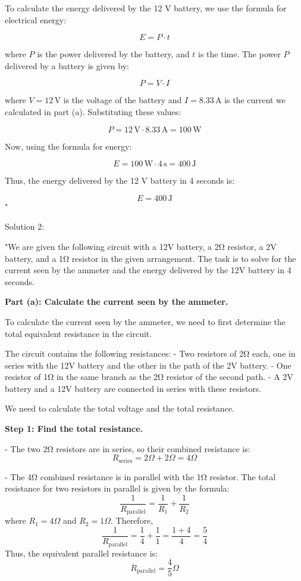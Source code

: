 To calculate the energy delivered by the 12 V battery, we use the formula for electrical energy:

\[
E = P \cdot t
\]

where \( P \) is the power delivered by the battery, and \( t \) is the time. The power \( P \) delivered by a battery is given by:

\[
P = V \cdot I
\]

where \( V = 12 \, \text{V} \) is the voltage of the battery and \( I = 8.33 \, \text{A} \) is the current we calculated in part (a). Substituting these values:

\[
P = 12 \, \text{V} \cdot 8.33 \, \text{A} = 100 \, \text{W}
\]

Now, using the formula for energy:

\[
E = 100 \, \text{W} \cdot 4 \, \text{s} = 400 \, \text{J}
\]

Thus, the energy delivered by the 12 V battery in 4 seconds is:

\[
E = 400 \, \text{J}
\]"

Solution 2:

"We are given the following circuit with a 12V battery, a 2Ω resistor, a 2V battery, and a 1Ω resistor in the given arrangement. The task is to solve for the current seen by the ammeter and the energy delivered by the 12V battery in 4 seconds.

\textbf{Part (a): Calculate the current seen by the ammeter.}

To calculate the current seen by the ammeter, we need to first determine the total equivalent resistance in the circuit.

The circuit contains the following resistances:
- Two resistors of 2Ω each, one in series with the 12V battery and the other in the path of the 2V battery.
- One resistor of 1Ω in the same branch as the 2Ω resistor of the second path.
- A 2V battery and a 12V battery are connected in series with these resistors.

We need to calculate the total voltage and the total resistance.

\textbf{Step 1: Find the total resistance.}

- The two 2Ω resistors are in series, so their combined resistance is:
  \[
  R_{\text{series}} = 2Ω + 2Ω = 4Ω
  \]

- The 4Ω combined resistance is in parallel with the 1Ω resistor. The total resistance for two resistors in parallel is given by the formula:
  \[
  \frac{1}{R_{\text{parallel}}} = \frac{1}{R_1} + \frac{1}{R_2}
  \]
  where \(R_1 = 4Ω\) and \(R_2 = 1Ω\). Therefore,
  \[
  \frac{1}{R_{\text{parallel}}} = \frac{1}{4} + \frac{1}{1} = \frac{1 + 4}{4} = \frac{5}{4}
  \]
  Thus, the equivalent parallel resistance is:
  \[
  R_{\text{parallel}} = \frac{4}{5}Ω
  \]

